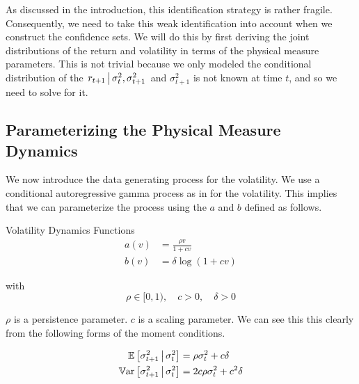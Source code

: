 \documentclass[11pt, letterpaper, twoside, final]{article}
\begin{document}
As discussed in the introduction, this identification strategy is rather fragile.
Consequently, we need to take this weak identification into account when we construct the confidence sets.
We will do this by first deriving the joint distributions of the return and volatility in terms of the physical
measure parameters.
This is not trivial because we only modeled the conditional distribution of the $\left. r_{t+1} \,\middle\vert\, \sigma^2_{t},
\sigma^2_{t+1} \right.$  and $\sigma^2_{t+1}$ is not known at time $t$, and so we need to solve for it.


\subsection{Parameterizing the Physical Measure Dynamics}

We now introduce the data generating process for the volatility.
We use a conditional autoregressive gamma process as in \textcite{gourieroux2006autoregressive, khrapov2016affine}
for the volatility.
This implies that we can parameterize the process using the $a$ and $b$ defined as follows.

\begin{defn}{Volatility Dynamics Functions}
    \label{defn:physical_vol_dynamics}
    \begin{align}
        \label{defn:a_PP}
        a(v) &= \frac{\rho v}{1 + c v} \\
        \label{defn:b_PP}
        b(v) &= \delta \log(1 + c v)
    \end{align}
    
    with 
    \begin{equation}
        \rho \in [0,1), \quad c > 0, \quad \delta > 0
    \end{equation}

\end{defn}

$\rho$ is a persistence parameter.
$c$ is a scaling parameter.
We can see this this clearly from the following forms of the moment conditions.

\begin{remark} 
    \label{remark:vol_moment_conditions}
    \begin{align}
        \E\left[\sigma^2_{t+1} \mvert \sigma^2_t \right]  &= \rho \sigma^2_t  + c \delta\\
%
        \Var\left[\sigma^2_{t+1} \mvert \sigma^2_t \right]  &=  2 c \rho \sigma^2_t  + c^2
        \delta 
%
    \end{align}
\end{remark}
\end{document}
